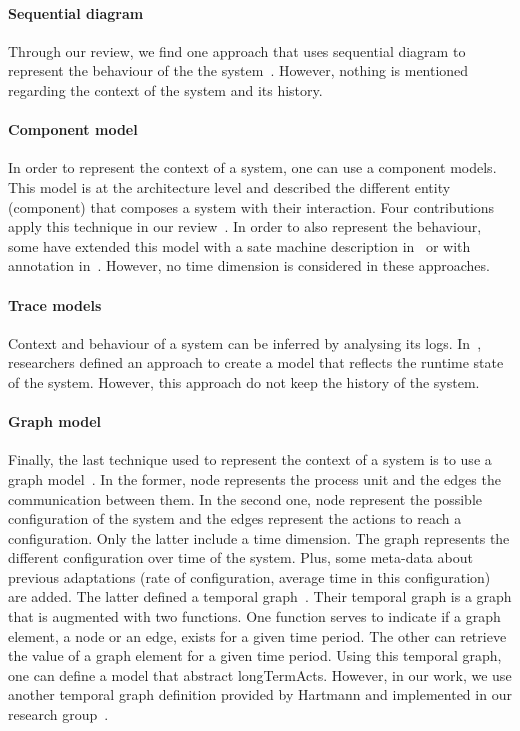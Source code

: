 \paragraph{Sequential diagram}
Through our review, we find one approach that uses sequential diagram to represent the behaviour of the the system~\cite{DBLP:conf/icse/TaharaOH17}.
However, nothing is mentioned regarding the context of the system and its history.
	
\paragraph{Component model}
In order to represent the context of a system, one can use a component models.
This model is at the architecture level and described the different entity (component) that composes a system with their interaction.
Four contributions apply this technique in our review~\cite{DBLP:conf/soco/DavidL06, DBLP:conf/wetice/DjoudiBZ14, DBLP:journals/computer/GarlanCHSS04, DBLP:conf/cbse/FouquetMFBPJ12}.
In order to also represent the behaviour, some have extended this model with a sate machine description in~\cite{DBLP:conf/wetice/DjoudiBZ14} or with annotation in~\cite{DBLP:journals/computer/GarlanCHSS04}.
However, no time dimension is considered in these approaches.

\paragraph{Trace models}
Context and behaviour of a system can be inferred by analysing its logs.
In~\cite{DBLP:journals/computer/Maoz09}, researchers defined an approach to create a model that reflects the runtime state of the system.
However, this approach do not keep the history of the system.
	
\paragraph{Graph model}
Finally, the last technique used to represent the context of a system is to use a graph model~\cite{DBLP:journals/tse/KramerM90, DBLP:journals/computer/GeorgasHT09, DBLP:conf/dbpl/MoffittS17}.
In the former, node represents the process unit and the edges the communication between them.
In the second one, node represent the possible configuration of the system and the edges represent the actions to reach a configuration.
Only the latter include a time dimension.
The graph represents the different configuration over time of the system.
Plus, some meta-data about previous adaptations (\eg rate of configuration, average time in this configuration) are added.
The latter defined a temporal graph~\cite{DBLP:conf/dbpl/MoffittS17}.
Their temporal graph is a graph that is augmented with two functions.
One function serves to indicate if a graph element, a node or an edge, exists for a given time period.
The other can retrieve the value of a graph element for a given time period.
Using this temporal graph, one can define a model that abstract \glspl{longTermAct}.
However, in our work, we use another temporal graph definition provided by Hartmann \etal and implemented in our research group~\cite{DBLP:journals/is/HartmannFMRT19}.

